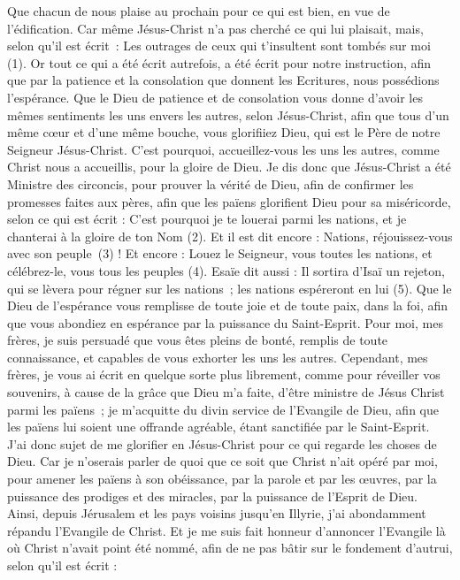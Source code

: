 \begin{multicols}{2}
Que chacun de nous plaise au prochain pour ce qui est bien, en vue de l’édification.
Car même Jésus-Christ n'a pas cherché ce qui lui plaisait, mais, selon qu’il est écrit : Les outrages de ceux qui t’insultent sont tombés sur moi (1).
Or tout ce qui a été écrit autrefois, a été écrit pour notre instruction, afin que par la patience et la consolation que donnent les Ecritures, nous possédions l’espérance.
Que le Dieu de patience et de consolation vous donne d’avoir les mêmes sentiments les uns envers les autres, selon Jésus-Christ,
afin que tous d'un même cœur et d'une même bouche, vous glorifiiez Dieu, qui est le Père de notre Seigneur Jésus-Christ.
C'est pourquoi, accueillez-vous les uns les autres, comme Christ nous a accueillis, pour la gloire de Dieu.
Je dis donc que Jésus-Christ a été Ministre des circoncis, pour prouver la vérité de Dieu, afin de confirmer les promesses faites aux pères,
afin que les païens glorifient Dieu pour sa miséricorde, selon ce qui est écrit : C’est pourquoi je te louerai parmi les nations, et je chanterai à la gloire de ton Nom (2). Et il est dit encore :
Nations, réjouissez-vous avec son peuple (3) !
Et encore : Louez le Seigneur, vous toutes les nations, et célébrez-le, vous tous les peuples (4). Esaïe dit aussi :
Il sortira d’Isaï un rejeton, qui se lèvera pour régner sur les nations ; les nations espéreront en lui (5).
Que le Dieu de l’espérance vous remplisse de toute joie et de toute paix, dans la foi, afin que vous abondiez en espérance par la puissance du Saint-Esprit.
Pour moi, mes frères, je suis persuadé que vous êtes pleins de bonté, remplis de toute connaissance, et capables de vous exhorter les uns les autres.
Cependant, mes frères, je vous ai écrit en quelque sorte plus librement, comme pour réveiller vos souvenirs, à cause de la grâce que Dieu m’a faite,
d’être ministre de Jésus Christ parmi les païens ; je m’acquitte du divin service de l'Evangile de Dieu, afin que les païens lui soient une offrande agréable, étant sanctifiée par le Saint-Esprit.
J'ai donc sujet de me glorifier en Jésus-Christ pour ce qui regarde les choses de Dieu.
Car je n’oserais parler de quoi que ce soit que Christ n’ait opéré par moi, pour amener les païens à son obéissance, par la parole et par les œuvres,
par la puissance des prodiges et des miracles, par la puissance de l'Esprit de Dieu. Ainsi, depuis Jérusalem et les pays voisins jusqu’en Illyrie, j’ai abondamment répandu l’Evangile de Christ.
Et je me suis fait honneur d’annoncer l’Evangile là où Christ n’avait point été nommé, afin de ne pas bâtir sur le fondement d’autrui, selon qu'il est écrit :

\end{multicols}
